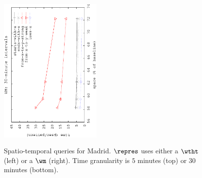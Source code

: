\begin{figure}[!ht]
\begin{center}
		{\includegraphics[angle=-90,width=0.45\textwidth]{figures_synt/madrid_wm30.eps}}
		
	\end{center}
	\vspace{-0.3cm}
	\caption{Spatio-temporal queries for Madrid. $\repres$ uses either a $\wtht$ (left) or a $\wm$ (right). 
		Time granularity is $5$ minutes (top) or $30$ minutes (bottom). 
	}
	\label{fig:madridst}
	\vspace{-0.3cm}




\end{figure}
